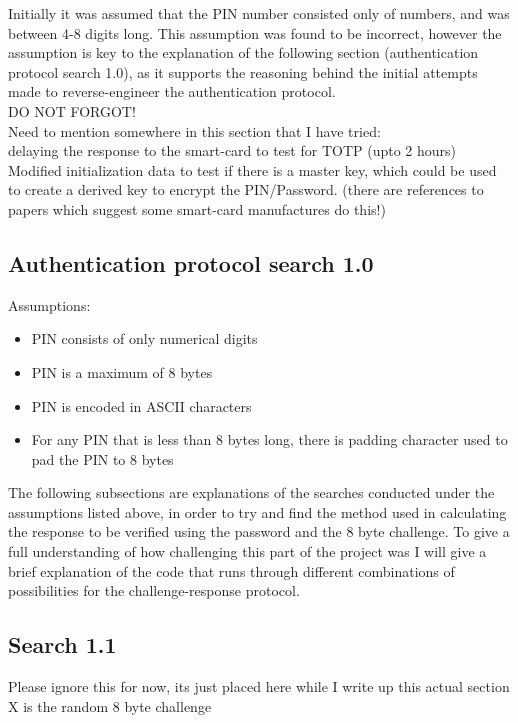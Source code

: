 \documentclass[bsc,frontabs,twoside,singlespacing,parskip,deptreport]{infthesis}     %
\begin{document}
Initially it was assumed that the PIN number consisted only of numbers, and was between 4-8 digits long. This assumption was found to be incorrect, however the assumption is key to the explanation of the following section (authentication protocol search 1.0), as it supports the reasoning behind the initial attempts made to reverse-engineer the authentication protocol. \\

DO NOT FORGOT!\\
Need to mention somewhere in this section that I have tried:\\
delaying the response to the smart-card to test for TOTP (upto 2 hours)\\
Modified initialization data to test if there is a master key, which could be used to create a derived key to encrypt the PIN/Password.
(there are references to papers which suggest some smart-card manufactures do this!)

\subsection{Authentication protocol search 1.0}
Assumptions:\\
\begin{itemize}
\item PIN consists of only numerical digits
\item PIN is a maximum of 8 bytes
\item PIN is encoded in ASCII characters
\item For any PIN that is less than 8 bytes long, there is padding character used to pad the PIN to 8 bytes
\end{itemize}

The following subsections are explanations of the searches conducted under the assumptions listed above, in order to try and find the method used in calculating the response to be verified using the password and the 8 byte challenge. To give a full understanding of how challenging this part of the project was I will give a brief explanation of the code that runs through different combinations of possibilities for the challenge-response protocol.

\subsection{Search 1.1}

Please ignore this for now, its just placed here while I write up this actual section\\
X is the random 8 byte challenge\\
\end{document}
